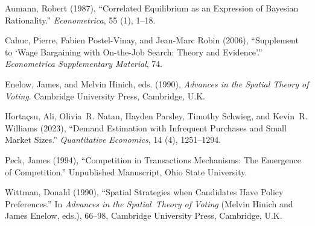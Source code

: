 \documentclass[ecta,nameyear,draft]{econsocart}
\theoremstyle{plain}
\theoremstyle{definition}
\begin{document}



\begin{thebibliography}{}

Aumann, Robert (1987),
``Correlated Equilibrium as an Expression of Bayesian Rationality.''
\textit{Econometrica}, 55 (1), 1--18.
\endbibitem

Cahuc, Pierre, Fabien Postel-Vinay, and Jean-Marc Robin (2006), ``Supplement to `Wage Bargaining with On-the-Job Search: Theory and Evidence'.''
\textit{Econometrica Supplementary Material}, 74.
\endbibitem

Enelow, James, and Melvin Hinich, eds. (1990),
\textit{Advances in the Spatial Theory of Voting}.
Cambridge University Press, Cambridge, U.K. 
\endbibitem

Horta\c{c}su, Ali, Olivia~R. Natan, Hayden Parsley, Timothy Schwieg, and Kevin~R. Williams (2023),
``Demand Estimation with Infrequent Purchases and Small Market Sizes.''
\textit{Quantitative Economics}, 14 (4), 1251--1294.
\endbibitem


Peck, James (1994),
``Competition in Transactions Mechanisms: The Emergence of Competition.''
Unpublished Manuscript, Ohio State University.
\endbibitem


Wittman, Donald (1990),
``Spatial Strategies when Candidates Have Policy Preferences.''
In \textit{Advances in the Spatial~Theory of Voting}
(Melvin Hinich and James Enelow, eds.), 66--98,
Cambridge University Press, Cambridge, U.K.
\endbibitem


\end{thebibliography}
\end{document}
